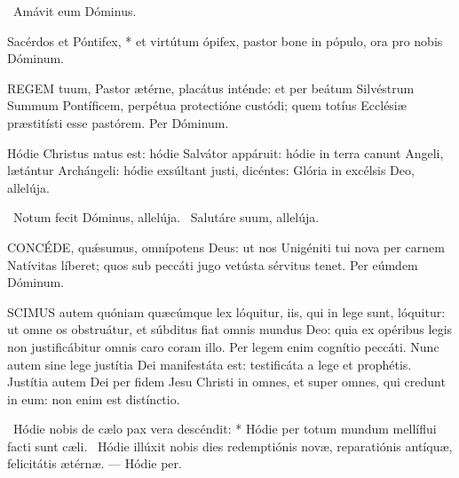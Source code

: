 
\V\ Amávit eum Dóminus.

 Sacérdos et Póntifex, * et virtútum ópifex, pastor bone in pópulo, ora pro nobis Dóminum.


\lettrine[lines=2]{R}{EGEM} tuum, Pastor ætérne, placátus inténde: et per beátum Silvéstrum Summum Pontíficem, perpétua protectióne custódi; quem totíus Ecclésiæ præstitísti esse pastórem. Per Dóminum.


 Hódie Christus natus est: hódie Salvátor appáruit: hódie in terra canunt Angeli, lætántur Archángeli: hódie exsúltant justi, dicéntes: Glória in excélsis Deo, allelúja.

\V\ Notum fecit Dóminus, allelúja. \R\ Salutáre suum, allelúja.


\lettrine[lines=2]{C}{ONCÉDE}, quǽsumus, omnípotens Deus: ut nos Unigéniti tui nova per carnem Natívitas líberet; quos sub peccáti jugo vetústa sérvitus tenet. Per eúmdem Dóminum.






\lettrine[lines=2]{S}{CIMUS} autem quóniam quæcúmque lex lóquitur, iis, qui in lege sunt, lóquitur: ut omne os obstruátur, et súbditus fiat omnis mundus Deo: quia ex opéribus legis non justificábitur omnis caro coram illo. Per legem enim cognítio peccáti. Nunc autem sine lege justítia Dei manifestáta est: testificáta a lege et prophétis. Justítia autem Dei per fidem Jesu Christi in omnes, et super omnes, qui credunt in eum: non enim est distínctio.

\R\ Hódie nobis de cælo pax vera descéndit: * Hódie per totum mundum mellíflui facti sunt cæli. \V\ Hódie illúxit nobis dies redemptiónis novæ, reparatiónis antíquæ, felicitátis ætérnæ. --- Hódie per.


